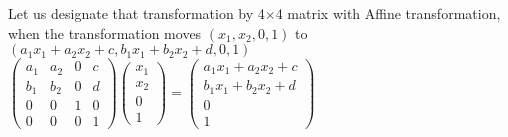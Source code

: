 \documentclass[11pt, oneside]{jsarticle} 	%
\begin{document}
 Let us designate that transformation by 4$\times$4 matrix with Affine transformation, \\when the transformation moves $(x_1,x_2,0,1)$ to $(a_1x_1 + a_2x_2+c,b_1x_1+b_2x_2+d,0,1)$\\
 $\begin{pmatrix}
 a_1 & a_2 & 0 &c\\
 b_1 & b_2 & 0 &d\\
 0 & 0 & 1 & 0\\
 0 & 0 & 0 & 1
\end{pmatrix}\begin{pmatrix}
 x_1\\
 x_2\\
 0\\
 1
\end{pmatrix}=\begin{pmatrix}
a_1x_1 + a_2x_2+c\\
b_1x_1+b_2x_2+d\\
0\\
1\end{pmatrix}$\\
\end{document}
